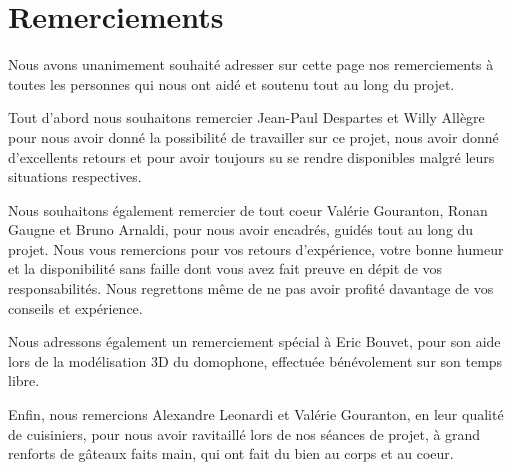 \section{Remerciements}

Nous avons unanimement souhaité adresser sur cette page nos remerciements à toutes les personnes qui nous ont aidé et soutenu tout au long du projet.

Tout d'abord nous souhaitons remercier Jean-Paul Despartes et Willy Allègre pour nous avoir donné la possibilité de travailler sur ce projet, nous avoir donné d'excellents retours et pour avoir toujours su se rendre disponibles malgré leurs situations respectives.

Nous souhaitons également remercier de tout coeur Valérie Gouranton, Ronan Gaugne et Bruno Arnaldi, pour nous avoir encadrés, guidés tout au long du projet. Nous vous remercions pour vos retours d'expérience, votre bonne humeur et la disponibilité sans faille dont vous avez fait preuve en dépit de vos responsabilités. Nous regrettons même de ne pas avoir profité davantage de vos conseils et expérience.

Nous adressons également un remerciement spécial à Eric Bouvet, pour son aide lors de la modélisation 3D du domophone, effectuée bénévolement sur son temps libre.

Enfin, nous remercions Alexandre Leonardi et Valérie Gouranton, en leur qualité de cuisiniers, pour nous avoir ravitaillé lors de nos séances de projet, à grand renforts de gâteaux faits main, qui ont fait du bien au corps et au coeur.
